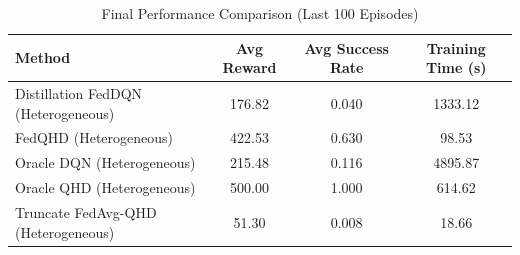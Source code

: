\begin{table}[t]
\centering
\caption{Final Performance Comparison (Last 100 Episodes)}
\label{tab:performance_summary}
\begin{tabular}{lccc}
\toprule
Method & Avg Reward & Avg Success Rate & Training Time (s) \\
\midrule
Distillation FedDQN (Heterogeneous) & 176.82 & 0.040 & 1333.12 \\
FedQHD (Heterogeneous) & 422.53 & 0.630 & 98.53 \\
Oracle DQN (Heterogeneous) & 215.48 & 0.116 & 4895.87 \\
Oracle QHD (Heterogeneous) & 500.00 & 1.000 & 614.62 \\
Truncate FedAvg-QHD (Heterogeneous) & 51.30 & 0.008 & 18.66 \\
\bottomrule
\end{tabular}
\end{table}